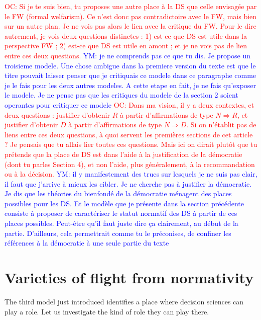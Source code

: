 \documentclass[preprint, french, english, 11pt]{elsarticle}%
\newcommand{\commentYM}[1]{\textcolor{blue}{YM: #1}}
\newcommand{\commentOC}[1]{\textcolor{red}{OC: #1}}
\begin{document}
\commentOC{Si je te suis bien, tu proposes une
autre place à la DS que celle envisagée par le FW (formal
welfarism). Ce n’est donc pas contradictoire avec le FW, mais
bien sur un autre plan. Je ne vois pas alors le lien avec la
critique du FW.
Pour le dire autrement, je vois deux questions distinctes : 1)
est-ce que DS est utile dans la perspective FW ; 2) est-ce que
DS est utile en amont ; et je ne vois pas de lien entre ces
deux questions.}
\commentYM{je ne comprends pas ce que tu dis. Je propose un troisieme modele. Une chose ambigue dans la premiere version du texte est que le titre pouvait laisser penser que je critiquais ce modele dans ce paragraphe comme je le fais pour les deux autres modeles. A cette etape en fait, je ne fais qu'exposer le modele. Je ne pense pas que les critiques du modele de la section 2 soient operantes pour critiquer ce modele}
\commentOC{Dans ma vision, il y a deux contextes, et deux questions : justifier d’obtenir $R$ à partir d’affirmations de type $N ⇒ R$, et justifier d’obtenir $D$ à partir d’affirmations de type $N ⇒ D$. Si on n’établit pas de liens entre ces deux questions, à quoi servent les premières sections de cet article ? Je pensais que tu allais lier toutes ces questions. Mais ici on dirait plutôt que tu prétends que la place de DS est dans l’aide à la justification de la démocratie (dont tu parles Section 4), et non l’aide, plus généralement, à la recommandation ou à la décision.}
\commentYM{il y manifestement des trucs sur lesquels je ne suis pas clair, il faut que j'arrive à mieux les cibler. Je ne cherche pas à justifier la démocratie. Je dis que les théories du bienfondé de la démocratie ménagent des places possibles pour les DS. Et le modèle que je présente dans la section précédente consiste à proposer de caractériser le statut normatif des DS à partir de ces places possibles. Peut-être qu'il faut juste dire ça clairement, au début de la partie. D'ailleurs, cela permettrait comme tu le préconises, de confiner les références à la démocratie à une seule partie du texte}

\section{Varieties of flight from normativity}
The third model just introduced identifies a place where decision sciences can play a role. Let us investigate the kind of role they can play there.
\end{document}
